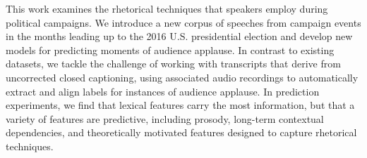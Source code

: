 This work examines the rhetorical techniques that speakers employ during political campaigns.  We introduce a new corpus of speeches from campaign events in the months leading up to the 2016 U.S. presidential election and develop new models for predicting moments of audience applause.  In contrast to existing datasets, we tackle the challenge of working with transcripts that derive from uncorrected closed captioning, using associated audio recordings to automatically extract and align labels for instances of audience applause.  In prediction experiments, we find that lexical features carry the most information, but that a variety of features are predictive, including prosody, long-term contextual dependencies, and theoretically motivated features designed to capture rhetorical techniques.
